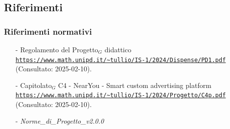 \documentclass[10pt]{article}
\begin{document}
\subsection{Riferimenti}
\subsubsection{Riferimenti normativi}
\begin{itemize}
    \item[-] Regolamento del Progetto$_G$ didattico  \\
    \textcolor{blue}{\texttt{\url{https://www.math.unipd.it/~tullio/IS-1/2024/Dispense/PD1.pdf}}}\\ (Consultato: 2025-02-10).
    \item[-] Capitolato$_G$ C4 - NearYou - Smart custom advertising platform\\
    \textcolor{blue}{\texttt{\url{https://www.math.unipd.it/~tullio/IS-1/2024/Progetto/C4p.pdf}}}\\ (Consultato: 2025-02-10).
    \item[-] \textit{Norme\_di\_Progetto\_v2.0.0}
\end{itemize}
\end{document}
